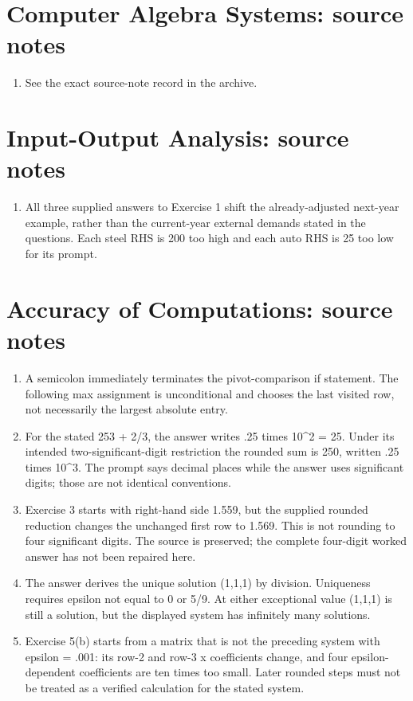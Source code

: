 \section*{Computer Algebra Systems: source notes}
\begin{enumerate}
\item See the exact source-note record in the archive.
\end{enumerate}
\section*{Input-Output Analysis: source notes}
\begin{enumerate}
\item All three supplied answers to Exercise 1 shift the already-adjusted next-year example, rather than the current-year external demands stated in the questions. Each steel RHS is 200 too high and each auto RHS is 25 too low for its prompt.
\end{enumerate}
\section*{Accuracy of Computations: source notes}
\begin{enumerate}
\item A semicolon immediately terminates the pivot-comparison if statement. The following max assignment is unconditional and chooses the last visited row, not necessarily the largest absolute entry.
\item For the stated 253 + 2/3, the answer writes .25 times 10\textasciicircum{}2 = 25. Under its intended two-significant-digit restriction the rounded sum is 250, written .25 times 10\textasciicircum{}3. The prompt says decimal places while the answer uses significant digits; those are not identical conventions.
\item Exercise 3 starts with right-hand side 1.559, but the supplied rounded reduction changes the unchanged first row to 1.569. This is not rounding to four significant digits. The source is preserved; the complete four-digit worked answer has not been repaired here.
\item The answer derives the unique solution (1,1,1) by division. Uniqueness requires epsilon not equal to 0 or 5/9. At either exceptional value (1,1,1) is still a solution, but the displayed system has infinitely many solutions.
\item Exercise 5(b) starts from a matrix that is not the preceding system with epsilon = .001: its row-2 and row-3 x coefficients change, and four epsilon-dependent coefficients are ten times too small. Later rounded steps must not be treated as a verified calculation for the stated system.
\end{enumerate}
